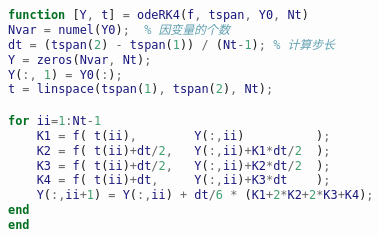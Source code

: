 \begin{lstlisting}[language=Matlab]
function [Y, t] = odeRK4(f, tspan, Y0, Nt)
Nvar = numel(Y0);  % 因变量的个数
dt = (tspan(2) - tspan(1)) / (Nt-1); % 计算步长
Y = zeros(Nvar, Nt);
Y(:, 1) = Y0(:);
t = linspace(tspan(1), tspan(2), Nt);

for ii=1:Nt-1
    K1 = f( t(ii),        Y(:,ii)          );
    K2 = f( t(ii)+dt/2,   Y(:,ii)+K1*dt/2  );
    K3 = f( t(ii)+dt/2,   Y(:,ii)+K2*dt/2  );
    K4 = f( t(ii)+dt,     Y(:,ii)+K3*dt    );
    Y(:,ii+1) = Y(:,ii) + dt/6 * (K1+2*K2+2*K3+K4);
end
end
\end{lstlisting}